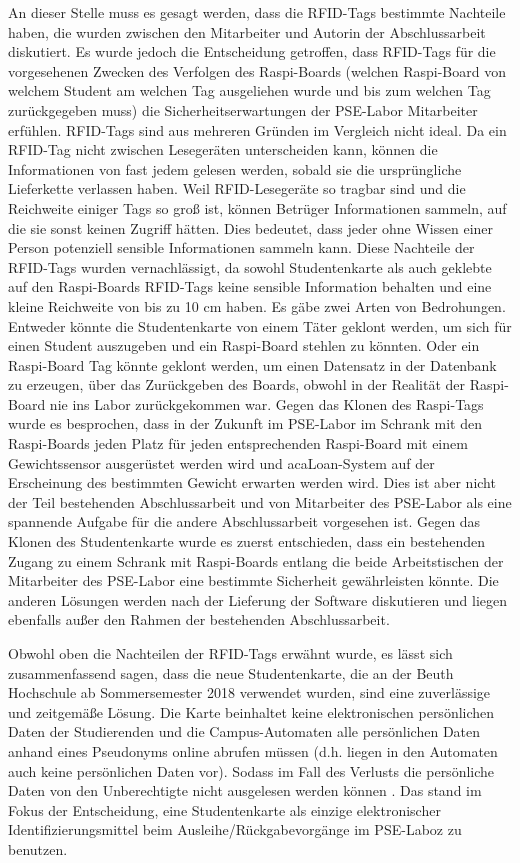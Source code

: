 An dieser Stelle muss es gesagt werden, dass die RFID-Tags bestimmte Nachteile haben, die wurden zwischen den Mitarbeiter und Autorin der Abschlussarbeit diskutiert. Es wurde jedoch die Entscheidung getroffen, dass RFID-Tags für die vorgesehenen Zwecken des Verfolgen des Raspi-Boards (welchen Raspi-Board von welchem Student am welchen Tag ausgeliehen wurde und bis zum welchen Tag zurückgegeben muss) die Sicherheitserwartungen der PSE-Labor Mitarbeiter erfühlen. RFID-Tags sind aus mehreren Gründen im Vergleich nicht ideal. Da ein RFID-Tag nicht zwischen Lesegeräten unterscheiden kann, können die Informationen von fast jedem gelesen werden, sobald sie die ursprüngliche Lieferkette verlassen haben. Weil RFID-Lesegeräte so tragbar sind und die Reichweite einiger Tags so groß ist, können Betrüger Informationen sammeln, auf die sie sonst keinen Zugriff hätten. Dies bedeutet, dass jeder ohne Wissen einer Person potenziell sensible Informationen sammeln kann. Diese Nachteile der RFID-Tags wurden vernachlässigt, da sowohl Studentenkarte als auch geklebte auf den Raspi-Boards RFID-Tags keine sensible Information behalten und eine kleine Reichweite von bis zu 10 cm haben. Es gäbe zwei Arten von Bedrohungen. Entweder könnte die Studentenkarte von einem Täter geklont werden, um sich für einen Student auszugeben und ein Raspi-Board stehlen zu könnten. Oder ein Raspi-Board Tag könnte geklont werden, um einen Datensatz in der Datenbank zu erzeugen, über das Zurückgeben des Boards, obwohl in der Realität der Raspi-Board nie ins Labor zurückgekommen war. Gegen das Klonen des Raspi-Tags wurde es besprochen, dass in der Zukunft im PSE-Labor im Schrank mit den Raspi-Boards jeden Platz für jeden entsprechenden Raspi-Board mit einem Gewichtssensor ausgerüstet werden wird und acaLoan-System auf der Erscheinung des bestimmten Gewicht erwarten werden wird. Dies ist aber nicht der Teil bestehenden Abschlussarbeit und von Mitarbeiter des PSE-Labor als eine spannende Aufgabe für die andere Abschlussarbeit vorgesehen ist. Gegen das Klonen des Studentenkarte wurde es zuerst entschieden, dass ein bestehenden Zugang zu einem Schrank mit Raspi-Boards entlang die beide Arbeitstischen der Mitarbeiter des PSE-Labor eine bestimmte Sicherheit gewährleisten könnte. Die anderen Lösungen werden nach der Lieferung der Software diskutieren und liegen ebenfalls außer den Rahmen der bestehenden Abschlussarbeit. 

Obwohl oben die Nachteilen der RFID-Tags erwähnt wurde, es lässt sich zusammenfassend sagen, dass die neue Studentenkarte, die an der Beuth Hochschule ab Sommersemester 2018 verwendet wurden, sind eine zuverlässige und zeitgemäße Lösung. Die Karte beinhaltet keine elektronischen persönlichen Daten der Studierenden und die Campus-Automaten alle persönlichen Daten anhand eines Pseudonyms online abrufen müssen (d.h. liegen in den Automaten auch keine persönlichen Daten vor). Sodass im Fall des Verlusts die persönliche Daten von den Unberechtigte nicht ausgelesen werden können \cite{website:12}. Das stand im Fokus der Entscheidung, eine Studentenkarte als einzige elektronischer Identifizierungsmittel beim Ausleihe/Rückgabevorgänge im PSE-Laboz zu benutzen.

